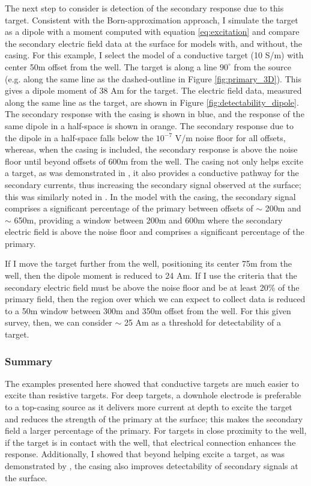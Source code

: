 The next step to consider is detection of the secondary response due to this target. Consistent with the Born-approximation approach, I simulate the target as a dipole with a moment computed with equation \ref{eq:excitation} and compare the secondary electric field data at the surface for models with, and without, the casing. For this example, I select the model of a conductive target (10 S/m) with center 50m offset from the well. The target is along a line $90^\circ$ from the source (e.g. along the same line as the dashed-outline in Figure \ref{fig:primary_3D}). This gives a dipole moment of 38 Am for the target. The electric field data, measured along the same line as the target, are shown in Figure \ref{fig:detectability_dipole}. The secondary response with the casing is shown in blue, and the response of the same dipole in a half-space is shown in orange. The secondary response due to the dipole in a half-space falls below the $10^{-7}$ V/m noise floor for all offsets, whereas, when the casing is included, the secondary response is above the noise floor until beyond offsets of 600m from the well. The casing not only helps excite a target, as was demonstrated in \cite{Schenkel1994}, it also provides a conductive pathway for the secondary currents, thus increasing the secondary signal observed at the surface; this was similarly noted in \cite{Yang2016}. In the model with the casing, the secondary signal comprises a significant percentage of the primary between offsets of $\sim$ 200m and $\sim$ 650m, providing a window between 200m and 600m where the secondary electric field is above the noise floor and comprises a significant percentage of the primary.

If I move the target further from the well, positioning its center 75m from the well, then the dipole moment is reduced to 24 Am. If I use the criteria that the secondary electric field must be above the noise floor and be at least 20\% of the primary field, then the region over which we can expect to collect data is reduced to a 50m window between 300m and 350m offset from the well. For this given survey, then, we can consider $\sim$ 25 Am as a threshold for detectability of a target.





\subsubsection{Summary}
The examples presented here showed that conductive targets are much easier to excite than resistive targets. For deep targets, a downhole electrode is preferable to a top-casing source as it delivers more current at depth to excite the target and reduces the strength of the primary at the surface; this makes the secondary field a larger percentage of the primary. For targets in close proximity to the well, if the target is in contact with the well, that electrical connection enhances the response. Additionally, I showed that beyond helping excite a target, as was demonstrated by \cite{Schenkel1994}, the casing also improves detectability of secondary signals at the surface.

